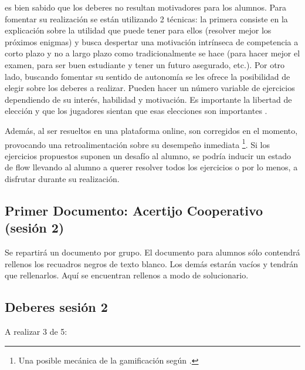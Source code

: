 	es bien sabido que los deberes no resultan motivadores para los alumnos. 
	Para fomentar su realización se están utilizando 2 técnicas: 
	la primera consiste en la explicación sobre la utilidad que puede tener para ellos (resolver mejor los próximos enigmas) y busca despertar una motivación intrínseca de competencia a corto plazo y no a largo plazo como tradicionalmente se hace (para hacer mejor el examen, para ser buen estudiante y tener un futuro asegurado, etc.).
	Por otro lado, buscando fomentar su sentido de autonomía se les ofrece la posibilidad de elegir sobre los deberes a realizar. 
	Pueden hacer un número variable de ejercicios dependiendo de su interés, habilidad y motivación.
	Es importante la libertad de elección y que los jugadores sientan que esas elecciones son importantes \citep{werbach2012win}.

	Además, al ser resueltos en una plataforma online, son corregidos en el momento, provocando una retroalimentación sobre su desempeño inmediata
	\footnote{Una posible mecánica de la gamificación según \citeauthor{werbach2012win}.}.
	Si los ejercicios propuestos suponen un desafío al alumno, se podría inducir un estado de flow llevando al alumno a querer resolver todos los ejercicios o por lo menos, a disfrutar durante su realización.


\subsection{Primer Documento: Acertijo Cooperativo (sesión 2)}
\label{app:ses2:coop}

Se repartirá un documento por grupo. 
%
El documento para alumnos sólo contendrá rellenos los recuadros negros de texto blanco.
%
Los demás estarán vacíos y tendrán que rellenarlos.
%
Aquí se encuentran rellenos a modo de solucionario.



\subsection{Deberes sesión 2}
\label{app:ses2:deberes}

\newbloq A realizar 3 de 5:


